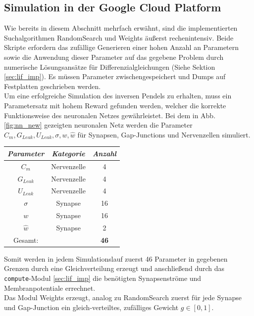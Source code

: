 	\subsection{Simulation in der Google Cloud Platform\textsuperscript{\textregistered}}
		Wie bereits in diesem Abschnitt mehrfach erwähnt, sind die implementierten Suchalgorithmen RandomSearch und Weights äußerst rechenintensiv. Beide Skripte erfordern das zufällige Generieren einer hohen Anzahl an Parametern sowie die Anwendung dieser Parameter auf das gegebene Problem durch numerische Lösungsansätze für Differenzialgleichungen (Siehe Sektion \ref{sec:lif_imp}). Es müssen Parameter zwischengespeichert und Dumps auf Festplatten geschrieben werden.\\
		Um eine erfolgreiche Simulation des inversen Pendels zu erhalten, muss ein Parametersatz mit hohem Reward gefunden werden, welcher die korrekte Funktionsweise des neuronalen Netzes gewährleistet. Bei dem in Abb. \ref{fig:nn_new} gezeigten neuronalen Netz werden die Parameter $C_m, G_{Leak}, U_{Leak}, \sigma, w, \hat{w}$ für Synapsen, Gap-Junctions und Nervenzellen simuliert.
		\begin{center}
			\begin{tabular}{c@{\hskip 0.5cm}c@{\hskip 0.5cm}c@{\hskip 0.5cm}}    \toprule
				\setlength{\tabcolsep}{50pt}
				\renewcommand{\arraystretch}{1.5}
				\emph{Parameter}	& \emph{Kategorie}  & \emph{Anzahl} \\\midrule
				$C_m$				& Nervenzelle		& 4				\\ 
				$G_{Leak}$	 		& Nervenzelle		& 4				\\
				$U_{Leak}$	 		& Nervenzelle		& 4				\\
				$\sigma$			& Synapse			& 16			\\
				$w$					& Synapse			& 16			\\ 
				$\hat{w}$			& Synapse			& 2				\\\bottomrule
				Gesamt:				&					& \textbf{46}	\\
				\hline
			\end{tabular}
		\end{center}
		Somit werden in jedem Simulationslauf zuerst 46 Parameter in gegebenen Grenzen durch eine Gleichverteilung erzeugt und anschließend durch das \texttt{compute}-Modul \ref{sec:lif_imp} die benötigten Synapsenströme und Membranpotentiale errechnet.\\
		Das Modul Weights erzeugt, analog zu RandomSearch zuerst für jede Synapse und Gap-Junction ein gleich-verteiltes, zufälliges Gewicht $g\in[0,1]$.
